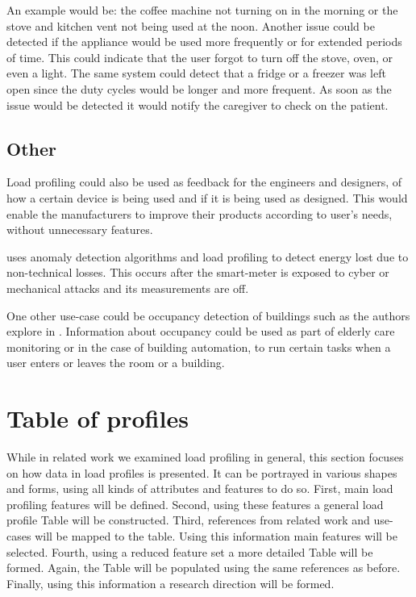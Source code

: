 An example would be: the coffee machine not turning on in the morning or the stove and kitchen vent not being used at the noon.
Another issue could be detected if the appliance would be used more frequently or for extended periods of time. 
This could indicate that the user forgot to turn off the stove, oven, or even a light. The same system could detect 
that a fridge or a freezer was left open since the duty cycles would be longer and more frequent. 
As soon as the issue would be detected it would notify the caregiver to check on the patient.

\subsection{Other}

Load profiling could also be used as feedback for the engineers and designers,
of how a certain device is being used and if it is being used as designed. 
This would enable the manufacturers to improve their products according to 
user's needs, without unnecessary features.

\cite{energyStealing2018} uses anomaly detection algorithms and load profiling to detect energy lost due to non-technical losses.
This occurs after the smart-meter is exposed to cyber or mechanical attacks and its measurements are off. 

One other use-case could be occupancy detection of buildings such as the authors explore in \cite{occupancy2013}. Information about 
occupancy could be used as part of elderly care monitoring or in the case of building
automation, to run certain tasks when a user enters or leaves the room or a building.

\section{Table of profiles}

While in related work we examined load profiling in general,
this section focuses on how data in load profiles is presented.  
It can be portrayed in various shapes and forms,
using all kinds of attributes and features to do so. 
First, main load profiling features will be defined.
Second, using these features a general load profile Table will be constructed.
Third, references from related work and use-cases will be mapped to the table.
Using this information main features will be selected.
Fourth, using a reduced feature set a more detailed Table will be formed.
Again, the Table will be populated using the same references as before.
Finally, using this information a research direction will be formed.

